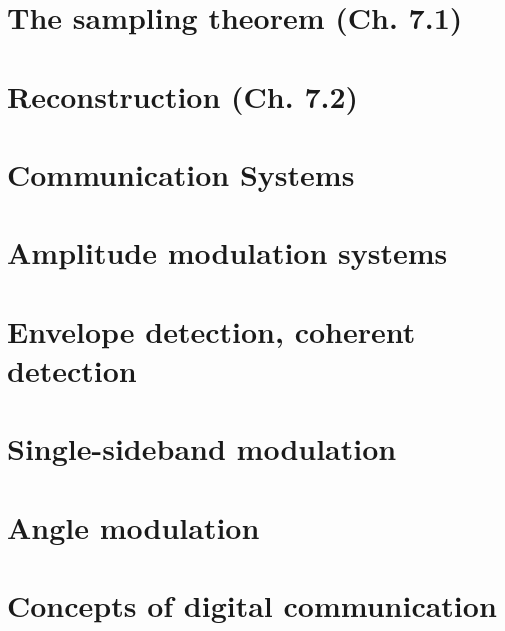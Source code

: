 \documentclass{article}
\begin{document}
\section{The sampling theorem (Ch. 7.1)}
\section{Reconstruction (Ch. 7.2)}

\section*{Communication Systems}
\section{Amplitude modulation systems}
\section{Envelope detection, coherent detection}
\section{Single-sideband modulation}
\section{Angle modulation}
\section{Concepts of digital communication}
\end{document}
